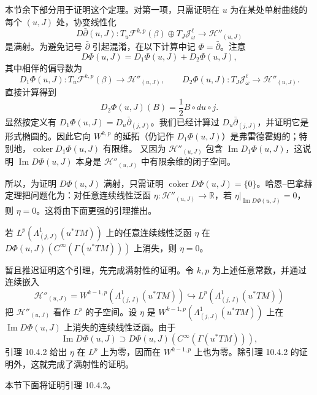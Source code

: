 本节余下部分用于证明这个定理。对第一项，只需证明在 $u$ 为在某处单射曲线的每个 $(u,J)$ 处，协变线性化
\[
 D\bar\partial(u,J):T_u\mathcal F^{k,p}(\beta)\oplus
 T_J\mathcal J_\omega^\ell\longrightarrow\mathcal H''_{(u,J)}
\]
是满射。为避免记号 $\bar\partial$ 引起混淆，在以下计算中记
$\Phi=\bar\partial$。注意
\[
 D\Phi(u,J)=D_1\Phi(u,J)+D_2\Phi(u,J),
\]
其中相伴的偏导数为
\[
 D_1\Phi(u,J):T_u\mathcal F^{k,p}(\beta)\to\mathcal H''_{(u,J)},
 \qquad
 D_2\Phi(u,J):T_J\mathcal J_\omega^\ell\to\mathcal H''_{(u,J)}.
\]
直接计算得到
\begin{equation}
 D_2\Phi(u,J)(B)=\frac12 B\circ du\circ j.
 \label{eq:variation-almost-complex-structure}
\end{equation}
显然按定义有 $D_1\Phi(u,J)=D_u\bar\partial_{(j,J)}$。我们已经计算过
$D_u\bar\partial_{(j,J)}$，并证明它是形式椭圆的。因此它向 $W^{k,p}$ 的延拓（仍记作
$D_1\Phi(u,J)$）是弗雷德霍姆的；特别地，$\operatorname{coker}D_1\Phi(u,J)$ 有限维。
又因为 $\mathcal H''_{(u,J)}$ 包含 $\operatorname{Im}D_1\Phi(u,J)$，这说明
$\operatorname{Im}D\Phi(u,J)$ 本身是 $\mathcal H''_{(u,J)}$ 中有限余维的闭子空间。

所以，为证明 $D\Phi(u,J)$ 满射，只需证明
$\operatorname{coker}D\Phi(u,J)=\{0\}$。哈恩--巴拿赫定理把问题化为：对任意连续线性泛函
$\eta:\mathcal H''_{(u,J)}\to\mathbb R$，若
$\eta|_{\operatorname{Im}D\Phi(u,J)}=0$，则 $\eta=0$。这将由下面更强的引理推出。

\begin{lemma}\label{lem:annihilator-universal-linearization}
若 $L^p(\Lambda_{(j,J)}^1(u^*TM))$ 上的任意连续线性泛函 $\eta$ 在
$D\Phi(u,J)(C^\infty(\Gamma(u^*TM)))$ 上消失，则 $\eta=0$。
\end{lemma}

暂且推迟证明这个引理，先完成满射性的证明。令 $k,p$ 为上述任意常数，并通过连续嵌入
\[
 \mathcal H''_{(u,J)}=W^{k-1,p}(\Lambda_{(j,J)}^1(u^*TM))
 \hookrightarrow L^p(\Lambda_{(j,J)}^1(u^*TM))
\]
把 $\mathcal H''_{(u,J)}$ 看作 $L^p$ 的子空间。设 $\eta$ 是
$W^{k-1,p}(\Lambda_{(j,J)}^1(u^*TM))$ 上在
$\operatorname{Im}D\Phi(u,J)$ 上消失的连续线性泛函。由于
\[
 \operatorname{Im}D\Phi(u,J)\supset
 D\Phi(u,J)(C^\infty(\Gamma(u^*TM))),
\]
引理 10.4.2 给出 $\eta$ 在 $L^p$ 上为零，因而在 $W^{k-1,p}$ 上也为零。除引理 10.4.2 的证明外，这就完成了满射性的证明。

本节下面将证明引理 10.4.2。

